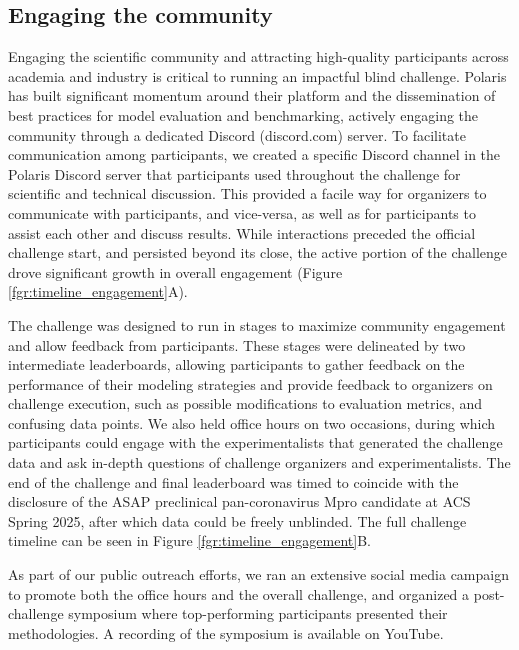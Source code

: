 \documentclass[journal=jcim,manuscript=article]{achemso}
\begin{document}
\subsection{Engaging the community}

Engaging the scientific community and attracting high-quality participants across academia and industry is critical to running an impactful blind challenge. Polaris has built significant momentum around their platform and the dissemination of best practices for model evaluation and benchmarking\cite{wognum_call_2024}, actively engaging the community through a dedicated Discord (discord.com) server. To facilitate communication among participants, we created a specific Discord channel in the Polaris Discord server that participants used throughout the challenge for scientific and technical discussion. This provided a facile way for organizers to communicate with participants, and vice-versa, as well as for participants to assist each other and discuss results. While interactions preceded the official challenge start, and persisted beyond its close, the active portion of the challenge drove significant growth in overall engagement (Figure \ref{fgr:timeline_engagement}A).

The challenge was designed to run in stages to maximize community engagement and allow feedback from participants. These stages were delineated by two intermediate leaderboards, allowing participants to gather feedback on the performance of their modeling strategies and provide feedback to organizers on challenge execution, such as possible modifications to evaluation metrics, and confusing data points. We also held office hours on two occasions, during which participants could engage with the experimentalists that generated the challenge data and ask in-depth questions of challenge organizers and experimentalists. The end of the challenge and final leaderboard was timed to coincide with the disclosure of the ASAP preclinical pan-coronavirus Mpro candidate at ACS Spring 2025\cite{griffen_2025_acs}, after which data could be freely unblinded. The full challenge timeline can be seen in Figure \ref{fgr:timeline_engagement}B.

As part of our public outreach efforts, we ran an extensive social media campaign to promote both the office hours and the overall challenge, and organized a post-challenge symposium where top-performing participants presented their methodologies. A recording of the symposium is available on YouTube\cite{openadmet_asap_workshop}. 
\end{document}
